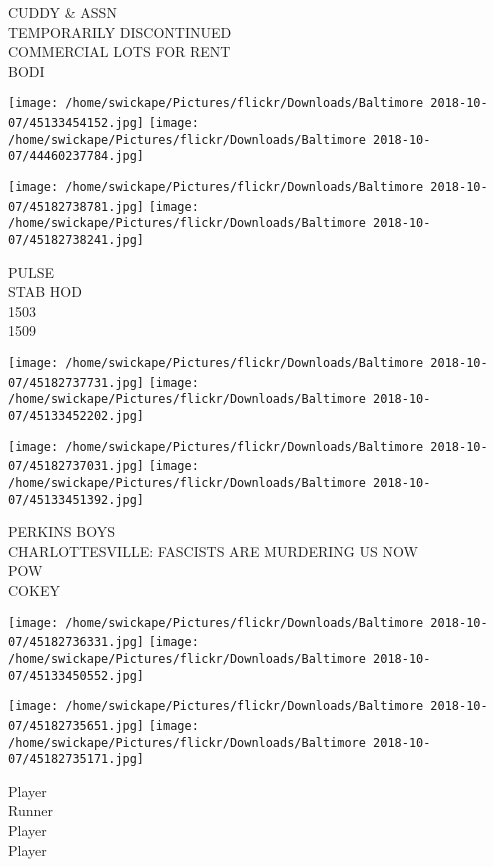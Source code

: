 \documentclass[10pt,letterpaper]{article}
\begin{document}
CUDDY \& ASSN\\
TEMPORARILY DISCONTINUED\\
COMMERCIAL LOTS FOR RENT\\
BODI\\
\pagebreak

\texttt{[image: /home/swickape/Pictures/flickr/Downloads/Baltimore 2018-10-07/45133454152.jpg]}
\texttt{[image: /home/swickape/Pictures/flickr/Downloads/Baltimore 2018-10-07/44460237784.jpg]}

\texttt{[image: /home/swickape/Pictures/flickr/Downloads/Baltimore 2018-10-07/45182738781.jpg]}
\texttt{[image: /home/swickape/Pictures/flickr/Downloads/Baltimore 2018-10-07/45182738241.jpg]}

PULSE\\
STAB HOD\\
1503\\
1509\\
\pagebreak

\texttt{[image: /home/swickape/Pictures/flickr/Downloads/Baltimore 2018-10-07/45182737731.jpg]}
\texttt{[image: /home/swickape/Pictures/flickr/Downloads/Baltimore 2018-10-07/45133452202.jpg]}

\texttt{[image: /home/swickape/Pictures/flickr/Downloads/Baltimore 2018-10-07/45182737031.jpg]}
\texttt{[image: /home/swickape/Pictures/flickr/Downloads/Baltimore 2018-10-07/45133451392.jpg]}

PERKINS BOYS\\
CHARLOTTESVILLE: FASCISTS ARE MURDERING US NOW\\
POW\\
COKEY\\
\pagebreak

\texttt{[image: /home/swickape/Pictures/flickr/Downloads/Baltimore 2018-10-07/45182736331.jpg]}
\texttt{[image: /home/swickape/Pictures/flickr/Downloads/Baltimore 2018-10-07/45133450552.jpg]}

\texttt{[image: /home/swickape/Pictures/flickr/Downloads/Baltimore 2018-10-07/45182735651.jpg]}
\texttt{[image: /home/swickape/Pictures/flickr/Downloads/Baltimore 2018-10-07/45182735171.jpg]}

Player\\
Runner\\
Player\\
Player\\
\pagebreak
\end{document}

